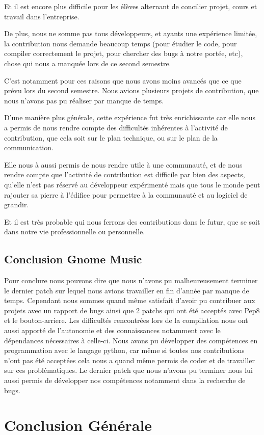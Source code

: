 \documentclass[12pt]{report}
\begin{document}
Et il est encore plus difficile pour les élèves alternant de concilier projet,
cours et travail dans l'entreprise.

De plus, nous ne somme pas tous développeurs, et ayants une expérience
limitée, la contribution nous demande beaucoup temps (pour étudier le code,
pour compiler correctement le projet, pour chercher des bugs à notre portée,
etc), chose qui nous a manquée lors de ce second semestre.

C'est notamment pour ces raisons que nous avons moins avancés que ce
que prévu lors du second semestre. Nous avions plusieurs projets de
contribution, que nous n'avons pas pu réaliser par manque de temps.

D'une manière plus générale, cette expérience fut très enrichissante car elle
nous a permis de nous rendre compte des difficultés inhérentes à
l'activité de contribution, que cela soit sur le plan technique, ou
sur le plan de la communication.

Elle nous à aussi permis de nous rendre utile à une communauté, et de nous
rendre compte que l'activité de contribution est difficile par bien des aspects,
qu'elle n'est pas réservé au développeur expérimenté mais que tous le monde peut
rajouter sa pierre à l'édifice pour permettre à la communauté et au logiciel
de grandir.

Et il est très probable qui nous ferrons des contributions dans le futur,
que se soit dans notre vie professionnelle ou personnelle.

\newpage
\section{Conclusion Gnome Music}
Pour conclure nous pouvons dire que nous n’avons pu malheureusement terminer le dernier patch sur lequel nous avions travailler en fin d’année par manque de temps. Cependant nous sommes quand même satisfait d’avoir pu contribuer aux projets avec un rapport de bugs ainsi que 2 patchs qui ont été acceptés avec Pep8 et le bouton-arriere. Les difficultés rencontrées lors de la compilation nous ont aussi apporté de l’autonomie et des connaissances notamment avec le dépendances nécessaires à celle-ci. Nous avons pu développer des compétences en programmation avec le langage python, car même si toutes nos contributions n’ont pas été acceptées cela nous a quand même permis de coder et de travailler sur ces problématiques. Le dernier patch que nous n’avons pu terminer nous lui aussi permis de développer nos compétences notamment dans la recherche de bugs.
\chapter{Conclusion Générale}
\end{document}
